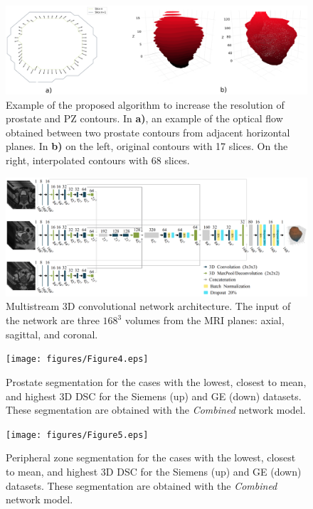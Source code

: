 \begin{figure}[ht]
    \centering
    \includegraphics[totalheight=.21\textheight]{figures/Figure2.eps}
    \caption{Example of the proposed algorithm to increase the resolution of prostate and PZ contours. In \textbf{a)}, an example of the optical flow obtained between two prostate contours from adjacent horizontal planes. In \textbf{b)} on the left, original contours with 17 slices. On the right, interpolated contours with 68 slices.}
    \label{fig:fig_2}
\end{figure}

\begin{figure}[ht]
    \centering
    \includegraphics[totalheight=.282\textheight]{figures/Figure3.eps}
    \caption{Multistream 3D convolutional network architecture. The input of the network are three $168^3$ volumes from the MRI planes: axial, sagittal, and coronal. }
    \label{fig:fig_3}
\end{figure}

\begin{figure}[ht]
    \centering
    \texttt{[image: figures/Figure4.eps]}
    \caption{Prostate segmentation for the cases with the lowest, closest to mean, and highest 3D DSC for the Siemens (up) and GE (down) datasets. These segmentation are obtained with the \emph{Combined} network model.  }
    \label{fig:resseg}
\end{figure} 

\begin{figure}[ht]
    \centering
    \texttt{[image: figures/Figure5.eps]}
    \caption{Peripheral zone segmentation for the cases with the lowest, closest to mean, and highest 3D DSC for the Siemens (up) and GE (down) datasets. These segmentation are obtained with the \emph{Combined} network model.  }
    \label{fig:ressegpz}
\end{figure} 
